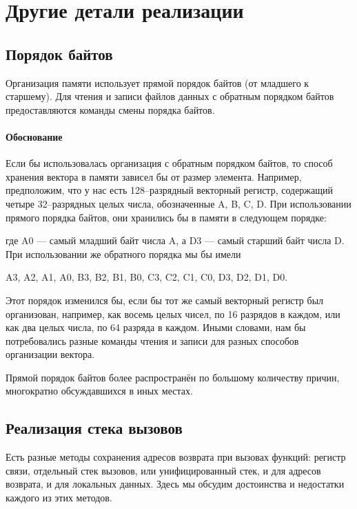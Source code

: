 \documentclass[forwardcom.tex]{subfiles}
\begin{document}
\chapter{Другие детали реализации}
\section{Порядок байтов} \label{endianness}
Организация памяти использует прямой порядок байтов (от младшего к старшему). Для чтения и записи файлов данных с обратным порядком байтов предоставляются команды смены порядка байтов.

\subsubsection{Обоснование}
Если бы использовалась организация с обратным порядком байтов, то способ хранения вектора в памяти зависел бы от размер элемента. Например, предположим, что у нас есть 128--разрядный векторный регистр, содержащий четыре 32--разрядных целых числа, обозначенные A, B, C, D. При использовании прямого порядка байтов, они хранились бы в памяти в следующем порядке:


\noindent 
где A0 --- самый младший байт числа A, а D3 --- самый старший байт числа D. При использовании же обратного порядка мы бы имели

A3, A2, A1, A0, B3, B2, B1, B0, C3, C2, C1, C0, D3, D2, D1, D0.

Этот порядок изменился бы, если бы тот же самый векторный регистр был организован, например, как восемь целых чисел, по 16 разрядов в каждом, или как два целых числа, по 64 разряда в каждом. Иными словами, нам бы потребовались разные команды чтения и записи для разных способов организации вектора.

Прямой порядок байтов более распространён по большому количеству причин, многократно обсуждавшихся в иных местах.

\section{Реализация стека вызовов} \label{callStackAlternatives}
Есть разные методы сохранения адресов возврата при вызовах функций: регистр связи, отдельный стек вызовов, или унифицированный стек, и для адресов возврата, и для локальных данных. Здесь мы обсудим достоинства и недостатки каждого из этих методов.
\end{document}
